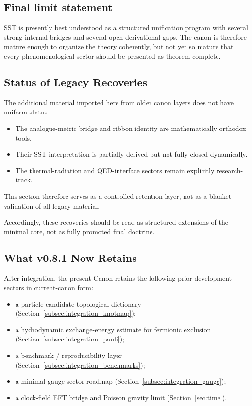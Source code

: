 \documentclass[11pt]{article}
\theoremstyle{definition}
\theoremstyle{plain}
\theoremstyle{remark}
\begin{document}
    \subsection{Final limit statement}
        SST is presently best understood as a structured unification program with several strong internal bridges and several open derivational gaps. The canon is therefore mature enough to organize the theory coherently, but not yet so mature that every phenomenological sector should be presented as theorem-complete.

    \subsection{Status of Legacy Recoveries}

        The additional material imported here from older canon layers does not have uniform status.

        \begin{itemize}
            \item The analogue-metric bridge and ribbon identity are mathematically orthodox tools.
            \item Their SST interpretation is partially derived but not fully closed dynamically.
            \item The thermal-radiation and QED-interface sectors remain explicitly research-track.
        \end{itemize}

        This section therefore serves as a controlled retention layer, not as a blanket validation of all legacy material.

        Accordingly, these recoveries should be read as structured extensions of the minimal core, not as fully promoted final doctrine.

    \subsection{What v0.8.1 Now Retains}

        After integration, the present Canon retains the following prior-development sectors in current-canon form:
        \begin{itemize}
            \item a particle-candidate topological dictionary (Section~\ref{subsec:integration_knotmap});
            \item a hydrodynamic exchange-energy estimate for fermionic exclusion
            (Section~\ref{subsec:integration_pauli});
            \item a benchmark / reproducibility layer (Section~\ref{subsec:integration_benchmarks});
            \item a minimal gauge-sector roadmap (Section~\ref{subsec:integration_gauge});
            \item a clock-field EFT bridge and Poisson gravity limit (Section~\ref{sec:time}).
        \end{itemize}
\end{document}
